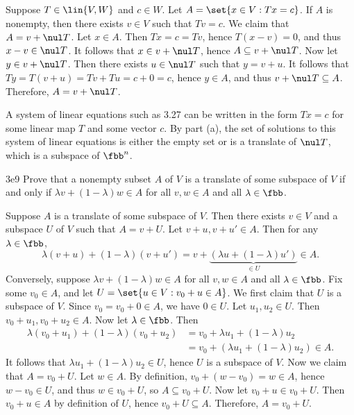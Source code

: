 \begin{solenum}
    \item Suppose $T \in \lin{V, W}$ and $c \in W$.
	Let $A = \set{x \in V : Tx = c}$.
	If $A$ is nonempty, then there exists $v \in V$ such that $Tv = c$.
	We claim that $A = v + \nul T$.
	Let $x \in A$.
	Then $Tx = c = Tv$, hence $T(x - v) = 0$, and thus $x - v \in \nul T$.
	It follows that $x \in v + \nul T$, hence $A \subseteq v + \nul T$.
	Now let $y \in v + \nul T$.
	Then there exists $u \in \nul T$ such that $y = v + u$.
	It follows that $Ty = T(v + u) = Tv + Tu = c + 0 = c$, hence $y \in A$, and thus $v + \nul T \subseteq A$.
	Therefore, $A = v + \nul T$.
    \item A system of linear equations such as 3.27 can be written in the form $Tx = c$ for some linear map $T$ and some vector $c$.
	By part (a), the set of solutions to this system of linear equations is either the empty set or is a translate of $\nul T$, which is a subspace of $\fbb^n$.
\end{solenum}

\begin{exercise}{3e9}
    Prove that a nonempty subset $A$ of $V$ is a translate of some subspace of $V$ if and only if $\lambda v + (1 - \lambda) w \in A$ for all $v, w \in A$ and all $\lambda \in \fbb$.
\end{exercise}

\begin{sol}
    Suppose $A$ is a translate of some subspace of $V$.
	Then there exists $v \in V$ and a subspace $U$ of $V$ such that $A = v + U$.
	Let $v + u, v + u' \in A$.
	Then for any $\lambda \in \fbb$,
    \[
    	\lambda (v + u) + (1 - \lambda) (v + u') = v + \underbrace{(\lambda u + (1 - \lambda) u')}_{\in U} \in A.
    \]
    Conversely, suppose $\lambda v + (1 - \lambda) w  \in A$ for all $v, w \in A$ and all $\lambda \in \fbb$.
	Fix some $v_0 \in A$, and let $U = \set{u \in V : v_0 + u \in A}$.
	We first claim that $U$ is a subspace of $V$.
	Since $v_0 = v_0 + 0 \in A$, we have $0 \in U$.
	Let $u_1, u_2 \in U$.
	Then $v_0 + u_1, v_0 + u_2 \in A$.
	Now let $\lambda \in \fbb$.
	Then
    \begin{align*}
        \lambda (v_0 + u_1) + (1 - \lambda)(v_0 + u_2) & = v_0 + \lambda u_1 + (1 - \lambda) u_2 \\
        & = v_0 + (\lambda u_1 + (1 - \lambda) u_2) \in A.
    \end{align*}
    It follows that $\lambda u_1 + (1 - \lambda) u_2 \in U$, hence $U$ is a subspace of $V$.
	Now we claim that $A = v_0 + U$.
	Let $w \in A$.
	By definition, $v_0 + (w - v_0) = w \in A$, hence $w - v_0 \in U$, and thus $w \in v_0 + U$, so $A \subseteq v_0 + U$.
	Now let $v_0 + u \in v_0 + U$.
	Then $v_0 + u \in A$ by definition of $U$, hence $v_0 + U \subseteq A$.
	Therefore, $A = v_0 + U$.
\end{sol}

